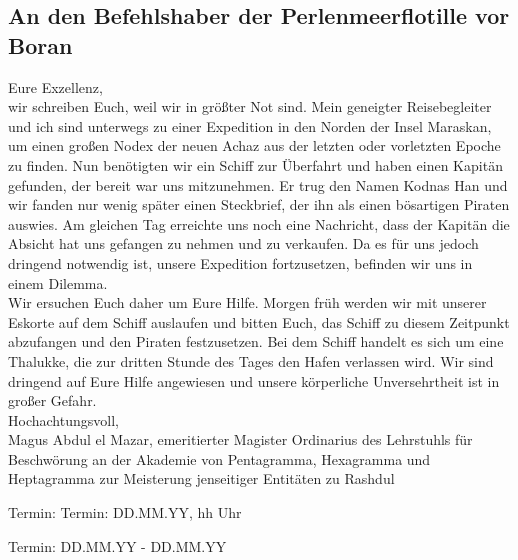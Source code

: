 \documentclass[final]{multiversum}
\begin{document}
\subsection{An den Befehlshaber der Perlenmeerflotille vor Boran}
Eure Exzellenz,\\
wir schreiben Euch, weil wir in größter Not sind.
Mein geneigter Reisebegleiter und ich sind unterwegs zu einer Expedition in den Norden der Insel Maraskan, um einen großen Nodex der neuen Achaz aus der letzten oder vorletzten Epoche zu finden.
Nun benötigten wir ein Schiff zur Überfahrt und haben einen Kapitän gefunden, der bereit war uns mitzunehmen.
Er trug den Namen Kodnas Han und wir fanden nur wenig später einen Steckbrief, der ihn als einen bösartigen Piraten auswies.
Am gleichen Tag erreichte uns noch eine Nachricht, dass der Kapitän die Absicht hat uns gefangen zu nehmen und zu verkaufen.
Da es für uns jedoch dringend notwendig ist, unsere Expedition fortzusetzen, befinden wir uns in einem Dilemma.\\
Wir ersuchen Euch daher um Eure Hilfe.
Morgen früh werden wir mit unserer Eskorte auf dem Schiff auslaufen und bitten Euch, das Schiff zu diesem Zeitpunkt abzufangen und den Piraten festzusetzen.
Bei dem Schiff handelt es sich um eine Thalukke, die zur dritten Stunde des Tages den Hafen verlassen wird.
Wir sind dringend auf Eure Hilfe angewiesen und unsere körperliche Unversehrtheit ist in großer Gefahr.\\
Hochachtungsvoll,\\
Magus Abdul el Mazar, emeritierter Magister Ordinarius des Lehrstuhls für Beschwörung an der Akademie von Pentagramma, Hexagramma und Heptagramma zur Meisterung jenseitiger Entitäten zu Rashdul



\begin{termine}
\item Termin: Termin: DD.MM.YY, hh Uhr
  \item Termin: DD.MM.YY - DD.MM.YY
\end{termine}
\impressum
\end{document}
